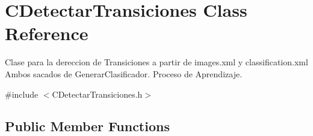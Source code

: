 \hypertarget{classCDetectarTransiciones}{}\section{C\+Detectar\+Transiciones Class Reference}
\label{classCDetectarTransiciones}


Clase para la dereccion de Transiciones a partir de images.\+xml y classification.\+xml Ambos sacados de Generar\+Clasificador. Proceso de Aprendizaje.  




{\ttfamily \#include $<$C\+Detectar\+Transiciones.\+h$>$}

\subsection*{Public Member Functions}
